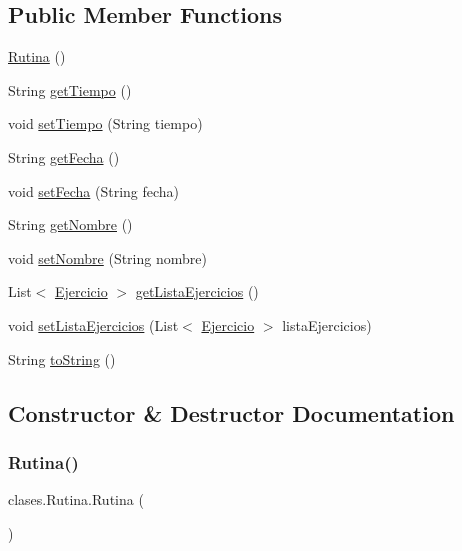\subsection*{Public Member Functions}
\begin{DoxyCompactItemize}
\item 
\mbox{\hyperlink{classclases_1_1_rutina_ab95adacf3a1e18e18ad15784fab53873}{Rutina}} ()
\item 
String \mbox{\hyperlink{classclases_1_1_rutina_a07c7e78b496f8a36252e77443f211274}{get\+Tiempo}} ()
\item 
void \mbox{\hyperlink{classclases_1_1_rutina_a631c31359d620089ee653561683efc61}{set\+Tiempo}} (String tiempo)
\item 
String \mbox{\hyperlink{classclases_1_1_rutina_abc6d6df453739c6166aafbfb77b1bedb}{get\+Fecha}} ()
\item 
void \mbox{\hyperlink{classclases_1_1_rutina_a9d5d8b01368164bfdb313a773e804301}{set\+Fecha}} (String fecha)
\item 
String \mbox{\hyperlink{classclases_1_1_rutina_ae4dab6884b2425ccfa957bbc5663bac7}{get\+Nombre}} ()
\item 
void \mbox{\hyperlink{classclases_1_1_rutina_aea665dc29f39c2b6439a3b4a2bd94d90}{set\+Nombre}} (String nombre)
\item 
List$<$ \mbox{\hyperlink{classclases_1_1_ejercicio}{Ejercicio}} $>$ \mbox{\hyperlink{classclases_1_1_rutina_ad861444ab5cf8946d898100d8bfd58a0}{get\+Lista\+Ejercicios}} ()
\item 
void \mbox{\hyperlink{classclases_1_1_rutina_a99004eb2c97b186320ad1ff84008dd04}{set\+Lista\+Ejercicios}} (List$<$ \mbox{\hyperlink{classclases_1_1_ejercicio}{Ejercicio}} $>$ lista\+Ejercicios)
\item 
String \mbox{\hyperlink{classclases_1_1_rutina_a0055e6a852f1cf59ffa9dfcae300d70d}{to\+String}} ()
\end{DoxyCompactItemize}


\subsection{Constructor \& Destructor Documentation}
\mbox{\label{classclases_1_1_rutina_ab95adacf3a1e18e18ad15784fab53873}} 
\subsubsection{\texorpdfstring{Rutina()}{Rutina()}}
{\footnotesize\ttfamily clases.\+Rutina.\+Rutina (\begin{DoxyParamCaption}{ }\end{DoxyParamCaption})}



